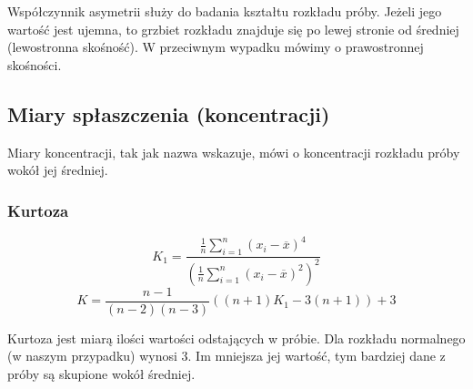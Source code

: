 \documentclass{article}
\theoremstyle{break}
\begin{document}
Współczynnik asymetrii służy do badania kształtu rozkładu próby. Jeżeli jego wartość jest ujemna, to grzbiet rozkładu znajduje się po lewej stronie od średniej (lewostronna skośność). W przeciwnym wypadku mówimy o prawostronnej skośności. 

\subsection{Miary spłaszczenia (koncentracji)}

Miary koncentracji, tak jak nazwa wskazuje, mówi o koncentracji rozkładu próby wokół jej średniej.

\subsubsection{Kurtoza}
$$K_1 =\frac{\frac{1}{n}\sum\limits_{i=1}^{n}(x_i-\overline{x})^4}{(\frac{1}{n}\sum\limits_{i=1}^{n}(x_i-\overline{x})^2)^2}$$
$$K=\frac{n-1}{(n-2)(n-3)}((n+1)K_1-3(n+1))+3$$

Kurtoza jest miarą ilości wartości odstających w próbie. Dla rozkładu normalnego (w naszym przypadku) wynosi 3. Im mniejsza jej wartość, tym bardziej dane z próby są skupione wokół średniej.
\end{document}
